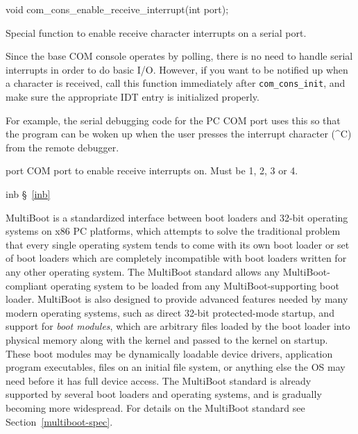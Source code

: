 \label{com-cons-enable-receive-interrupt}
\begin{apisyn}

	\funcproto void com_cons_enable_receive_interrupt(int port);
\end{apisyn}
\begin{apidesc}
	Special function to enable receive character interrupts on a
	serial port.

	Since the base COM console operates by polling,
	there is no need to handle serial interrupts in order to do basic I/O.
	However, if you want to be notified up when a character is received,
	call this function immediately after {\tt com_cons_init},
	and make sure the appropriate IDT entry is initialized properly.

	For example, the serial debugging code for the PC COM port
	uses this so that the program can be woken up
	when the user presses the interrupt character (\^{}C)
	from the remote debugger.
\end{apidesc}
\begin{apiparm}
	\item[port]
		COM port to enable receive interrupts on.
		Must be 1, 2, 3 or 4.
\end{apiparm}
\begin{apidep}
	\item[inb]	\S~\ref{inb}
\end{apidep}


\label{kern-x86pc-multiboot}

MultiBoot is a standardized interface
between boot loaders and 32-bit operating systems
on x86 PC platforms,
which attempts to solve the traditional problem
that every single operating system
tends to come with its own boot loader or set of boot loaders
which are completely incompatible with boot loaders
written for any other operating system.
The MultiBoot standard allows any MultiBoot-compliant operating system
to be loaded from any MultiBoot-supporting boot loader.
MultiBoot is also designed to provide advanced features
needed by many modern operating systems,
such as direct 32-bit protected-mode startup,
and support for \emph{boot modules},
which are arbitrary files loaded by the boot loader into physical memory
along with the kernel
and passed to the kernel on startup.
These boot modules may be dynamically loadable device drivers,
application program executables, files on an initial file system,
or anything else the OS may need before it has full device access.
The MultiBoot standard is already supported
by several boot loaders and operating systems,
and is gradually becoming more widespread.
For details on the MultiBoot standard
see Section~\ref{multiboot-spec}.

